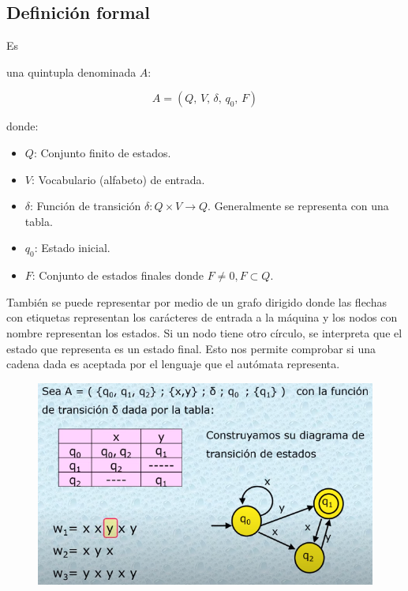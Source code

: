 \documentclass[stu, 12pt, letterpaper, donotrepeattitle, floatsintext, natbib]{apa7}
\begin{document}
\subsection{Definición formal}
Es \begin{justifying}
    una quintupla denominada \(A\): \par
\end{justifying}
\[A=\left(Q,\, V,\, \delta,\, q_0,\, F \right)\]
\begin{justifying}
    donde:
    \begin{itemize}
        \item \(Q\): Conjunto finito de estados.
        \item \(V\): Vocabulario (alfabeto) de entrada.
        \item \(\delta\): Función de transición \(\delta: Q\times V \rightarrow Q\). Generalmente se representa con una tabla.
        \item \(q_0\): Estado inicial.
        \item \(F\): Conjunto de estados finales donde \(F\neq 0, F\subset Q\).
    \end{itemize}\par
\end{justifying}
\begin{justifying}
    También se puede representar por medio de un grafo dirigido donde las flechas con etiquetas representan
    los carácteres de entrada a la máquina y los nodos con nombre representan los estados. Si un nodo tiene otro círculo,
    se interpreta que el estado que representa es un estado final. Esto nos permite comprobar si una cadena dada es aceptada
    por el lenguaje que el autómata representa.\par
\end{justifying}
\begin{figure}[H]
    \centering
    \includegraphics[width=15cm]{ejemplo_automata.png}
\end{figure}
\vspace{\baselineskip}
\end{document}

